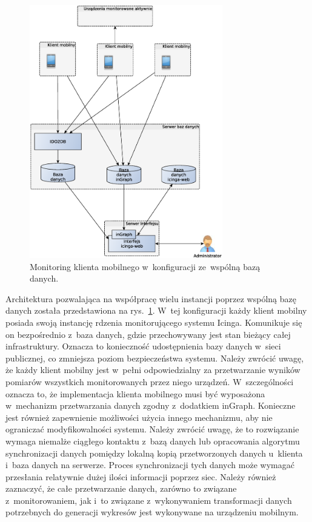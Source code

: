 \begin{figure}[ht]
  \centering
  \caption{Monitoring klienta mobilnego w~konfiguracji ze~wspólną bazą
    danych.}
  \label{fig:mobilnyWspBaza}
\includegraphics[width=0.75\textwidth]{img/mobilnyWspBaza}
\end{figure}

Architektura pozwalająca na współpracę wielu instancji poprzez wspólną
bazę danych została przedstawiona na
rys.~\ref{fig:mobilnyWspBaza}. W~tej konfiguracji każdy klient mobilny
posiada swoją instancję rdzenia monitorującego systemu
Icinga. Komunikuje się on bezpośrednio z~baza danych, gdzie
przechowywany jest stan bieżący całej infrastruktury. Oznacza to
konieczność udostępnienia bazy danych w~sieci publicznej, co zmniejsza
poziom bezpieczeństwa systemu. Należy zwrócić uwagę, że każdy klient
mobilny jest w~pełni odpowiedzialny za przetwarzanie wyników pomiarów
wszystkich monitorowanych przez niego urządzeń. W~szczególności
oznacza to, że implementacja klienta mobilnego musi być wyposażona
w~mechanizm przetwarzania danych zgodny z~dodatkiem inGraph. Konieczne
jest również zapewnienie możliwości użycia innego mechanizmu, aby nie
ograniczać modyfikowalności systemu. Należy zwrócić uwagę, że to
rozwiązanie wymaga niemalże ciągłego kontaktu z~bazą danych lub
opracowania algorytmu synchronizacji danych pomiędzy lokalną kopią
przetworzonych danych u~klienta i~baza danych na serwerze. Proces
synchronizacji tych danych może wymagać przesłania relatywnie dużej
ilości informacji poprzez siec. Należy również zaznaczyć, że całe
przetwarzanie danych, zarówno to związane z~monitorowaniem, jak i~to
związane z~wykonywaniem transformacji danych potrzebnych do generacji
wykresów jest wykonywane na urządzeniu mobilnym.

